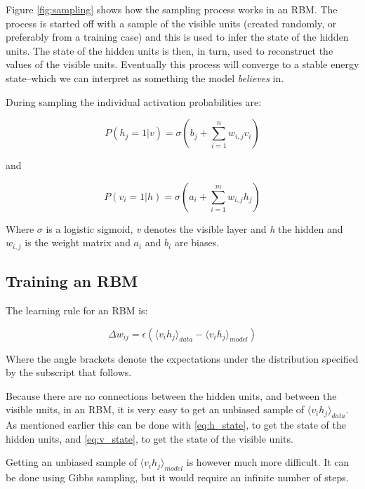 \documentclass[11pt]{article}
\begin{document}
Figure \ref{fig:sampling} shows how the sampling process works in an RBM.  The process is started off with a sample of the visible units (created randomly, or preferably from a training case) and this is used to infer the state of the hidden units.  The state of the hidden units is then, in turn, used to reconstruct the values of the visible units.  Eventually this process will converge to a stable energy state--which we can interpret as something the model \textit{believes} in.

During sampling the individual activation probabilities are:

\begin{equation}
  \label{eq:h_state}
   P(h_j=1|v) = \sigma(b_j + \sum_{i=1}^n w_{i,j} v_i)
\end{equation}

and

\begin{equation}
\label{eq:v_state}
  P(v_i=1|h) = \sigma(a_i + \sum_{i=1}^m w_{i,j} h_j)
\end{equation}

Where $\sigma$ is a logistic sigmoid, \textit{v} denotes the visible layer and \textit{h} the hidden and $w_{i,j}$ is the weight matrix and $a_i$ and $b_i$ are biases.

\subsection{Training an RBM}

The learning rule for an RBM is:

\begin{equation}
\label{eq:training}
  \Delta w_{ij} = \epsilon(\langle v_ih_j\rangle_{data} - \langle v_ih_j\rangle_{model})
\end{equation}

Where the angle brackets denote the expectations under the distribution specified by the subscript that follows.

Because there are no connections between the hidden units, and between the visible units, in an RBM, it is very easy to get an unbiased sample of $\langle v_ih_j\rangle_{data}$.  As mentioned earlier this can be done with \ref{eq:h_state}, to get the state of the hidden units, and \ref{eq:v_state}, to get the state of the visible units.

Getting an unbiased sample of $\langle v_ih_j\rangle_{model}$ is however much more difficult.  It can be done using Gibbs sampling, but it would require an infinite number of steps.
\end{document}
